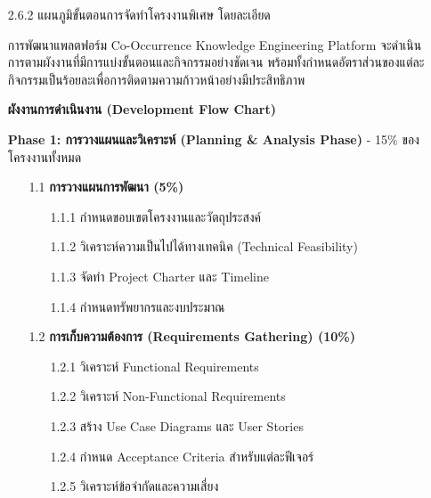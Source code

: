 \documentclass[12pt,a4paper]{article}
\newcommand{\textlight}[1]{{\thailightfont #1}}
\begin{document}
\begin{enumerate}[leftmargin=2cm]
    \vspace{0.4cm}

    \item[2.6.2] แผนภูมิขั้นตอนการจัดทำโครงงานพิเศษ โดยละเอียด
    \vspace{0.05cm}
    \\
    \textlight{
        \hspace{1cm}การพัฒนาแพลตฟอร์ม Co-Occurrence Knowledge Engineering Platform จะดำเนินการตามผังงานที่มีการแบ่งขั้นตอนและกิจกรรมอย่างชัดเจน พร้อมทั้งกำหนดอัตราส่วนของแต่ละกิจกรรมเป็นร้อยละเพื่อการติดตามความก้าวหน้าอย่างมีประสิทธิภาพ

        \vspace{0.5cm}

        \textbf{ผังงานการดำเนินงาน (Development Flow Chart)}

        \vspace{0.3cm}

        \textbf{Phase 1: การวางแผนและวิเคราะห์ (Planning \& Analysis Phase)} \textlight{- 15\% ของโครงงานทั้งหมด}

        \begin{enumerate}
            \item[1.1] \textbf{การวางแผนการพัฒนา (5\%)} 
            \begin{enumerate}
                \item[1.1.1] กำหนดขอบเขตโครงงานและวัตถุประสงค์
                \item[1.1.2] วิเคราะห์ความเป็นไปได้ทางเทคนิค (Technical Feasibility)
                \item[1.1.3] จัดทำ Project Charter และ Timeline
                \item[1.1.4] กำหนดทรัพยากรและงบประมาณ
            \end{enumerate}
            
            \item[1.2] \textbf{การเก็บความต้องการ (Requirements Gathering) (10\%)}
            \begin{enumerate}
                \item[1.2.1] วิเคราะห์ Functional Requirements
                \item[1.2.2] วิเคราะห์ Non-Functional Requirements
                \item[1.2.3] สร้าง Use Case Diagrams และ User Stories
                \item[1.2.4] กำหนด Acceptance Criteria สำหรับแต่ละฟีเจอร์
                \item[1.2.5] วิเคราะห์ข้อจำกัดและความเสี่ยง
            \end{enumerate}
        \end{enumerate}

}
\end{enumerate}
\end{document}

